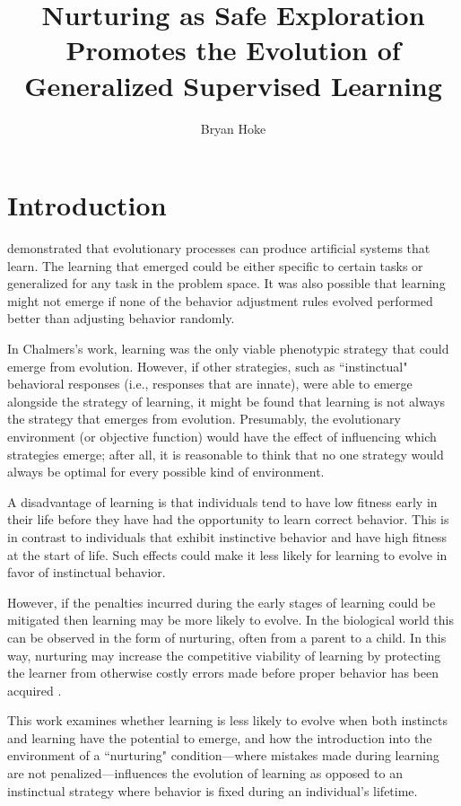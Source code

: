 \documentclass[master]{outhesis}
\title{Nurturing as Safe Exploration Promotes the Evolution of Generalized Supervised Learning}
\author{Bryan Hoke}
\begin{document}
\makefrontmatter

\chapter{Introduction}

\citet{Chalmers:1990aa} demonstrated that evolutionary processes can produce artificial systems that learn.
The learning that emerged could be either specific to certain tasks or generalized for any task in the problem space.
It was also possible that learning might not emerge if none of the behavior adjustment rules evolved performed better than adjusting behavior randomly.

In Chalmers's work, learning was the only viable phenotypic strategy that could emerge from evolution.
However, if other strategies, such as ``instinctual" behavioral responses (i.e., responses that are innate), were able to emerge alongside the strategy of learning, it might be found that learning is not always the strategy that emerges from evolution.
Presumably, the evolutionary environment (or objective function) would have the effect of influencing which strategies emerge; after all, it is reasonable to think that no one strategy would always be optimal for every possible kind of environment. %

A disadvantage of learning is that individuals tend to have low fitness early in their life before they have had the opportunity to learn correct behavior.
This is in contrast to individuals that exhibit instinctive behavior and have high fitness at the start of life.
Such effects could make it less likely for learning to evolve in favor of instinctual behavior.

However, if the penalties incurred during the early stages of learning could be mitigated then learning may be more likely to evolve.
In the biological world this can be observed in the form of nurturing, often from a parent to a child.
In this way, nurturing may increase the competitive viability of learning by protecting the learner from otherwise costly errors made before proper behavior has been acquired \citep{Woehrer:2012aa}.
                                                                                                                                    
This work examines whether learning is less likely to evolve when both instincts and learning have the potential to emerge,
and how the introduction into the environment of a ``nurturing" condition---where mistakes made during learning are not penalized---influences the evolution of learning as opposed to an instinctual strategy where behavior is fixed during an individual's lifetime.
\end{document}
